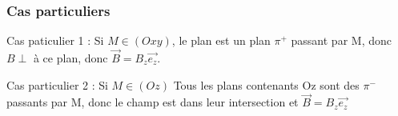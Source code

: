 \documentclass[french]{yLectureNote}
\renewcommand{\vec}{\overrightarrow}
\newcommand{\dd}{\mathrm{d}}
\newcommand{\B}{\vec{B}(M)}
\newcommand{\er}{\vec{e_{\rho}}}
\newcommand{\ep}{\vec{e_{\varphi}}}
\newcommand{\pip}{\pi^+}
\newcommand{\pim}{\pi^-}
\begin{document}
\subsubsection{Cas particuliers}
Cas paticulier 1 : Si \(M\in (Oxy)\), le plan est un plan \(\pip\) passant par M, donc \(B\perp\) à ce plan, donc \(\vec{B} = B_z\vec{e_z}\).

Cas particulier 2 : Si \(M\in (Oz)\) Tous les plans contenants Oz sont des \(\pim\) passants par M, donc le champ est dans leur intersection et \(\vec{B} = B_z\vec{e_z}\)

%

%
%
%
%
%
%
%
\end{document}
